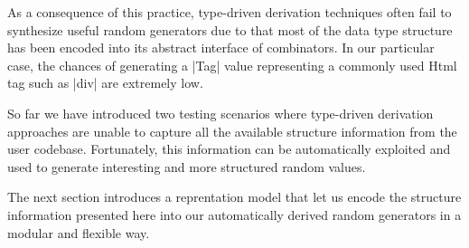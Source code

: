 As a consequence of this practice, type-driven derivation techniques often fail
to synthesize useful random generators due to that most of the data type
structure has been encoded into its abstract interface of combinators.
%
In our particular case, the chances of generating a |Tag| value representing a
commonly used Html tag such as |div| are extremely low.









So far we have introduced two testing scenarios where type-driven derivation
approaches are unable to capture all the available structure information from
the user codebase.
%
Fortunately, this information can be automatically exploited and used to
generate interesting and more structured random values.

The next section introduces a reprentation model that let us encode the
structure information presented here into our automatically derived random
generators in a modular and flexible way.
